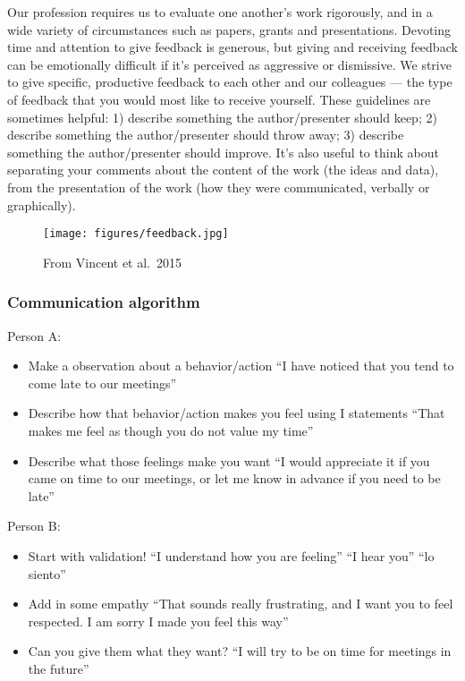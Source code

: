 \documentclass[12pt]{article}
\begin{document}
Our profession requires us to evaluate one another's work rigorously,
and in a wide variety of circumstances such as papers, grants and
presentations. Devoting time and attention to give feedback is
generous, but giving and receiving feedback can be emotionally
difficult if it's perceived as aggressive or dismissive. We strive to
give specific, productive feedback to each other and our colleagues —
the type of feedback that you would most like to receive
yourself. These guidelines are sometimes helpful: 1) describe
something the author/presenter should keep; 2) describe something the
author/presenter should throw away; 3) describe something the
author/presenter should improve. It's also useful to think about
separating your comments about the content of the work (the ideas and
data), from the presentation of the work (how they were communicated,
verbally or graphically).

\begin{figure}
  \centering
  \texttt{[image: figures/feedback.jpg]}
  \caption{From Vincent et al.~2015}
  \label{fig:feedback}
\end{figure}



\subsubsection{Communication algorithm}
Person A: 
\begin{itemize}
\item  Make a observation about a behavior/action ``I have noticed that you
  tend to come late to our meetings''
\item Describe how that behavior/action makes you feel using I
  statements ``That makes me feel as though you do not value my time''
\item Describe what those feelings make you want ``I would appreciate
  it if you came on time to our meetings, or let me know in advance if
  you need to be late''
\end{itemize}

Person B: 
\begin{itemize}
\item Start with validation! ``I understand how you are feeling'' ``I
  hear you'' ``lo siento'' 
\item Add in some empathy ``That sounds really frustrating, and I
  want you to feel respected. I am sorry I made you feel this way''
\item Can you give them what they want? ``I will try to be on time for
  meetings in the future'' 
\end{itemize}
\end{document}
